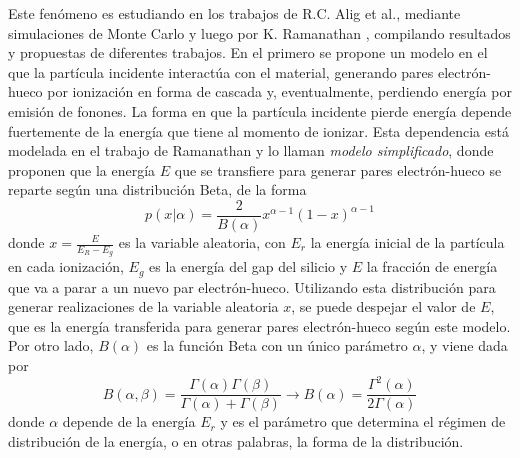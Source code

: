 Este fenómeno es estudiando en los trabajos de R.C. Alig et al.\cite{Alig}, mediante simulaciones de Monte Carlo y luego por K. Ramanathan \cite{Ramanathan}, compilando resultados y propuestas de diferentes trabajos. En el primero se propone un modelo en el que la partícula incidente interactúa con el material, generando pares electrón-hueco por ionización en forma de cascada y, eventualmente, perdiendo energía por emisión de fonones. La forma en que la partícula incidente pierde energía depende fuertemente de la energía que tiene al momento de ionizar. Esta dependencia está modelada en el trabajo de Ramanathan\cite{Ramanathan} y lo llaman \textit{modelo simplificado}, donde proponen que la energía $E$ que se transfiere para generar pares electrón-hueco se reparte según una distribución Beta, de la forma
\begin{equation*}
    p(x|\alpha) = \frac{2}{B(\alpha)} x^{\alpha - 1}(1-x)^{\alpha - 1}
\end{equation*}
donde $x = \frac{E}{E_{R} - E_{g}}$ es la variable aleatoria, con $E_{r}$ la energía inicial de la partícula en cada ionización, $E_{g}$ es la energía del gap del silicio y $E$ la fracción de energía que va a parar a un nuevo par electrón-hueco. Utilizando esta distribución para generar realizaciones de la variable aleatoria $x$, se puede despejar el valor de $E$, que es la energía transferida para generar pares electrón-hueco según este modelo. Por otro lado, $B(\alpha)$ es la función Beta con un único parámetro $\alpha$, y viene dada por
\begin{equation*}
    B(\alpha, \beta) 
    = \frac{\Gamma(\alpha)\Gamma(\beta)}{\Gamma(\alpha) + \Gamma(\beta)}
    \longrightarrow
    B(\alpha)
    = \frac{\Gamma^{2}(\alpha)}{2\Gamma(\alpha)}
\end{equation*}
donde $\alpha$ depende de la energía $E_{r}$ y es el parámetro que determina el régimen de distribución de la energía, o en otras palabras, la forma de la distribución.

